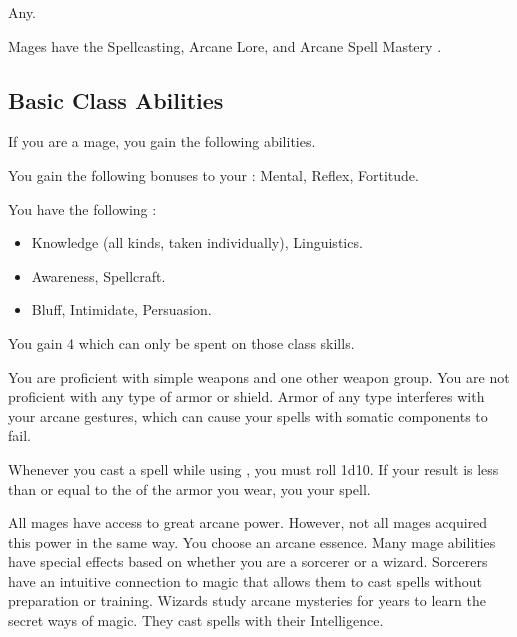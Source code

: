      Any.

     Mages have the Spellcasting, Arcane Lore, and Arcane Spell Mastery .

    \subsection{Basic Class Abilities}
        If you are a mage, you gain the following abilities.

        You gain the following bonuses to your :  Mental,  Reflex,  Fortitude.

        You have the following :
        \begin{itemize}
            \item {} Knowledge (all kinds, taken individually), Linguistics.
            \item {} Awareness, Spellcraft.
            \item {} Bluff, Intimidate, Persuasion.
        \end{itemize}
        You gain 4  which can only be spent on those class skills.

        You are proficient with simple weapons and one other weapon group.
        You are not proficient with any type of armor or shield.
        Armor of any type interferes with your arcane gestures, which can cause your spells with somatic components to fail.

        Whenever you cast a spell while using , you must roll 1d10.
        If your result is less than or equal to the  of the armor you wear, you  your spell.

        All mages have access to great arcane power.
        However, not all mages acquired this power in the same way.
        You choose an arcane essence.
        Many mage abilities have special effects based on whether you are a sorcerer or a wizard.
         Sorcerers have an intuitive connection to magic that allows them to cast spells without preparation or training.
         Wizards study arcane mysteries for years to learn the secret ways of magic.
        They cast spells with their Intelligence.

